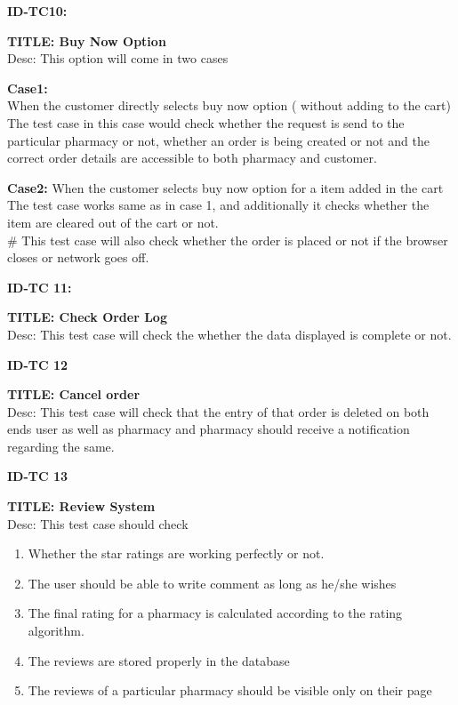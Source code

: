 \documentclass{article}
\begin{document}
\item \textbf{ID-TC10:}
\item \textbf{TITLE: Buy Now Option}\\
Desc: This option will come in two cases\\
\item \textbf{Case1:}\\
When the customer directly selects buy now option  ( without adding to the cart)\\
The test case in this case would check whether the request is send to the particular pharmacy or not, whether an order is being created or not and the correct order details are accessible to both pharmacy and customer.\\

\item \textbf{Case2:}
When the customer selects buy now option for a item added in the cart\\
The test case works same as in case 1, and additionally it checks whether the item are cleared out of the cart or not.
\\
# This test case will also check whether the order is placed or not if the browser closes or network goes off.\\

\item \textbf{ID-TC 11:}
\item \textbf{TITLE: Check Order Log}\\
Desc: This test case will check the whether the data displayed is complete or not.\\

\item \textbf{ID-TC 12}
\item \textbf{TITLE: Cancel order}\\
Desc: This test case will check that the entry of that order is deleted on both ends user as well as pharmacy and pharmacy should receive a notification regarding the same.\\

\item \textbf{ID-TC 13}
\item \textbf{TITLE: Review System}\\
Desc: This test case should check
\begin{enumerate}
\item	Whether the star ratings are working perfectly or not.
\item The user should be able to write comment as long as he/she wishes
\item The final rating  for a pharmacy is calculated according to the rating algorithm.
\item The reviews are stored properly in the database 
\item The reviews of a particular pharmacy should be visible only on their page
\end{enumerate}
\end{document}
